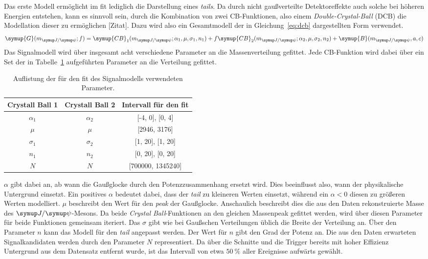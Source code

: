 Das erste Modell ermöglicht im fit lediglich die Darstellung eines \textit{tails}. Da durch nicht gaußverteilte Detektoreffekte auch solche bei höheren Energien entstehen, kann es sinnvoll sein, durch die Kombination von zwei CB-Funktionen, also einem \textit{Double-Crystal-Ball} (DCB) die Modellation dieser zu ermöglichen [Zitat]. Dazu wird also ein Gesamtmodell der in Gleichung~\ref{eq:dcb} dargestellten Form verwendet.
%
\begin{equation}
  \symup{G}(m_{\jpsi}; f)=\symup{CB}_1(m_{\jpsi};\alpha_1,\mu,\sigma_1,n_1) + f\symup{CB}_2(m_{\jpsi};\alpha_2,\mu,\sigma_2,n_2) + \symup{B}(m_{\jpsi},a,c)
  \label{eq:dcb}
\end{equation}
%
Das Signalmodell wird über insgesamt acht verschiedene Parameter an die Massenverteilung gefittet. Jede CB-Funktion wird dabei über ein Set der in Tabelle~\ref{tab:params} aufgeführten Parameter an die Verteilung gefittet.
%
\begin{table}[H]
  \centering
  \caption{Auflistung der für den fit des Signalmodells verwendeten Parameter.}
  \begin{tabular}{ccc}
    \toprule
    \textbf{Crystall Ball 1}    & \textbf{Crystall Ball 2} & Intervall für den fit \\
    \midrule
    $\alpha_1$                  & $\alpha_2$               & [-4, 0], [0, 4] \\
    $\mu$                       & $\mu$                    & [2946, 3176] \\
    $\sigma_1$                  & $\sigma_2$               & [1, 20], [1, 20] \\
    $n_1$                       & $n_2$                    & [0, 20], [0, 20] \\
    $N$                         & $N$                      & [700000, 1345240] \\
    \bottomrule
  \end{tabular}
  \label{tab:params}
\end{table}
%
$\alpha$ gibt dabei an, ab wann die Gaußglocke durch den Potenzzusammenhang ersetzt wird. Dies beeinflusst also, wann der physikalische Untergrund einsetzt. Ein positives $\alpha$ bedeutet dabei, dass der \textit{tail} zu kleineren Werten einsetzt, während ein $\alpha<0$ diesen zu größeren Werten modelliert. $\mu$ beschreibt den Wert für den \textit{peak} der Gaußglocke. Anschaulich beschreibt dies die aus den Daten rekonstruierte Masse des $\jpsi$-Mesons. Da beide \textit{Crystal Ball}-Funktionen an den gleichen Massenpeak gefittet werden, wird über diesen Parameter für beide Funktionen gemeinsam iteriert. Das $\sigma$ gibt wie bei Gaußschen Verteilungen üblich die Breite der Verteilung an. Über den Parameter $n$ kann das Modell für den \textit{tail} angepasst werden. Der Wert für $n$ gibt den Grad der Potenz an. Die aus den Daten erwarteten Signalkandidaten werden durch den Parameter $N$ representiert. Da über die Schnitte und die Trigger bereits mit hoher Effizienz Untergrund aus dem Datensatz entfernt wurde, ist das Intervall von etwa $\SI{50}{\percent}$ aller Ereignisse aufwärts gewählt.

